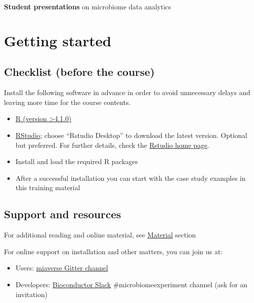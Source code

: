 \documentclass[
  oneside]{book}
\providecommand{\tightlist}{%
  \setlength{\itemsep}{0pt}\setlength{\parskip}{0pt}}
\begin{document}
\textbf{Student presentations} on microbiome data analytics

\hypertarget{getting-started}{%
\chapter{Getting started}\label{getting-started}}

\hypertarget{checklist-before-the-course}{%
\section{Checklist (before the course)}\label{checklist-before-the-course}}

Install the following software in advance in order to avoid
unnecessary delays and leaving more time for the course contents.

\begin{itemize}
\item
  \href{https://www.r-project.org/}{R (version \textgreater4.1.0)}
\item
  \href{https://www.rstudio.com/products/rstudio/download/}{RStudio};
  choose ``Rstudio Desktop'' to download the latest version. Optional
  but preferred. For further details, check the \href{https://www.rstudio.com/}{Rstudio home
  page}.
\item
  Install and load the required R packages
\item
  After a successful installation you can start with the
  case study examples in this training material
\end{itemize}

\hypertarget{support-and-resources}{%
\section{Support and resources}\label{support-and-resources}}

For additional reading and online material, see \href{material.html}{Material} section

For online support on installation and other matters, you can join us at:

\begin{itemize}
\tightlist
\item
  Users: \href{https://gitter.im/microbiome/miaverse?utm_source=badge\&utm_medium=badge\&utm_campaign=pr-badge\&utm_content=badge}{miaverse Gitter channel}
\item
  Developers: \href{https://bioc-community.herokuapp.com}{Bioconductor Slack} \#microbiomeexperiment channel (ask for an invitation)
\end{itemize}
\end{document}
